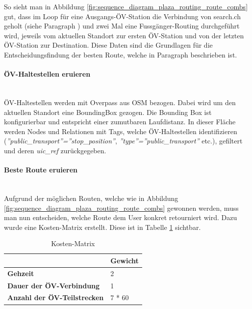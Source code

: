 So sieht man in Abbildung \ref{fig:sequence_diagram_plaza_routing_route_combs} gut, dass im Loop für eine Ausgangs-ÖV-Station die Verbindung von search.ch \cite{search_ch_route_api} geholt (siehe Paragraph ) und zwei Mal eine Fussgänger-Routing durchgeführt wird, jeweils vom aktuellen Standort zur ersten ÖV-Station und von der letzten ÖV-Station zur Destination. Diese Daten sind die Grundlagen für die Entscheidungsfindung der besten Route, welche in Paragraph  beschrieben ist.

\paragraph{ÖV-Haltestellen eruieren}\label{impl:Plaza Routing ÖV-Haltestellen eruieren}~\\
ÖV-Haltestellen werden mit Overpass \cite{wiki:overpass} aus \ac{OSM} bezogen. Dabei wird um den aktuellen Standort eine \gls{BoundingBox} gezogen. Die Bounding Box ist konfigurierbar und entspricht einer zumutbaren Laufdistanz. In dieser Fläche werden Nodes und Relationen mit Tags, welche ÖV-Haltestellen identifizieren (\emph{''public\_transport''=''stop\_position''}, \emph{''type''=''public\_transport''} etc.), gefiltert und deren \emph{uic\_ref} zurückgegeben.

\paragraph{Beste Route eruieren}\label{impl:Plaza Routing Beste Route eruieren}~\\
Aufgrund der möglichen Routen, welche wie in Abbildung \ref{fig:sequence_diagram_plaza_routing_route_combs} gewonnen werden, muss man nun entscheiden, welche Route dem User konkret retourniert wird. Dazu wurde eine Kosten-Matrix erstellt. Diese ist in Tabelle \ref{table:cost-matrix} sichtbar.

\begin{table}[ht]
    \centering
    \begin{tabular}{l|l}
        & \textbf{Gewicht} \\ \hline
        \textbf{Gehzeit}                    & 2                \\
        \textbf{Dauer der ÖV-Verbindung}    & 1                \\
        \textbf{Anzahl der ÖV-Teilstrecken} & 7 * 60          
    \end{tabular}
    \caption{Kosten-Matrix}
    \label{table:cost-matrix}
\end{table}

